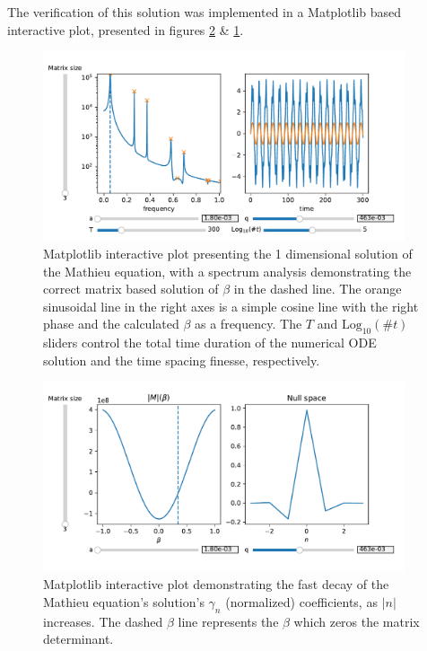 The verification of this solution was implemented in a Matplotlib\cite{Matplotlib} based interactive plot, presented in figures \ref{fig:pure-mathieu-coefficients} \& \ref{fig:pure-mathieu-fft}.

\begin{figure}
	\begin{center}
		\includegraphics[width=0.95\textwidth]{graphics/pure-mathieu-fft.pdf}
	\end{center}
	\caption{Matplotlib interactive plot presenting the 1 dimensional solution of the Mathieu equation, with a spectrum analysis demonstrating the correct matrix based solution of $\beta$ in the dashed line. The orange sinusoidal line in the right axes is a simple cosine line with the right phase and the calculated $\beta$ as a frequency. The $T$ and $\mathrm{Log}_{10}(\#t)$ sliders control the total time duration of the numerical ODE solution and the time spacing finesse, respectively.}
	\label{fig:pure-mathieu-fft}
\end{figure}

\begin{figure}
	\begin{center}
		\includegraphics[width=0.95\textwidth]{graphics/pure-mathieu-kernel.pdf}
	\end{center}
	\caption{Matplotlib interactive plot demonstrating the fast decay of the Mathieu equation's solution's $\gamma_n$ (normalized) coefficients, as $|n|$ increases. The dashed $\beta$ line represents the $\beta$ which zeros the matrix determinant.}
	\label{fig:pure-mathieu-coefficients}
\end{figure}

